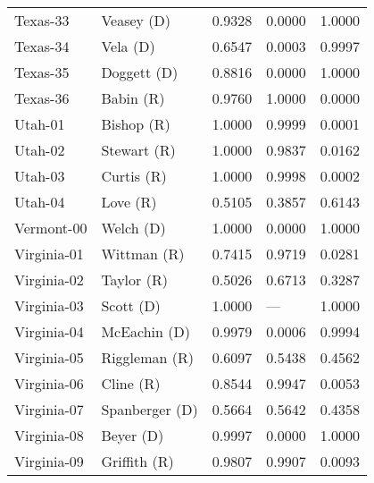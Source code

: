 \begin{longtable}{llrll}
          Texas-33 &           {\color{Blue} Veasey (D)} &       0.9328 &        0.0000 &        1.0000 \\
          Texas-34 &             {\color{Blue} Vela (D)} &       0.6547 &        0.0003 &        0.9997 \\
          Texas-35 &          {\color{Blue} Doggett (D)} &       0.8816 &        0.0000 &        1.0000 \\
          Texas-36 &             {\color{Red} Babin (R)} &       0.9760 &        1.0000 &        0.0000 \\
           Utah-01 &            {\color{Red} Bishop (R)} &       1.0000 &        0.9999 &        0.0001 \\
           Utah-02 &           {\color{Red} Stewart (R)} &       1.0000 &        0.9837 &        0.0162 \\
           Utah-03 &            {\color{Red} Curtis (R)} &       1.0000 &        0.9998 &        0.0002 \\
           Utah-04 &              {\color{Red} Love (R)} &       0.5105 &        0.3857 &        0.6143 \\
        Vermont-00 &            {\color{Blue} Welch (D)} &       1.0000 &        0.0000 &        1.0000 \\
       Virginia-01 &           {\color{Red} Wittman (R)} &       0.7415 &        0.9719 &        0.0281 \\
       Virginia-02 &            {\color{Red} Taylor (R)} &       0.5026 &        0.6713 &        0.3287 \\
       Virginia-03 &            {\color{Blue} Scott (D)} &       1.0000 &           --- &        1.0000 \\
       Virginia-04 &         {\color{Blue} McEachin (D)} &       0.9979 &        0.0006 &        0.9994 \\
       Virginia-05 &         {\color{Red} Riggleman (R)} &       0.6097 &        0.5438 &        0.4562 \\
       Virginia-06 &             {\color{Red} Cline (R)} &       0.8544 &        0.9947 &        0.0053 \\
       Virginia-07 &       {\color{Blue} Spanberger (D)} &       0.5664 &        0.5642 &        0.4358 \\
       Virginia-08 &            {\color{Blue} Beyer (D)} &       0.9997 &        0.0000 &        1.0000 \\
       Virginia-09 &          {\color{Red} Griffith (R)} &       0.9807 &        0.9907 &        0.0093 \\

\end{longtable}
